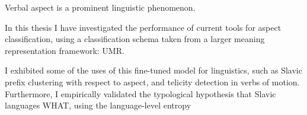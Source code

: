 Verbal aspect is a prominent linguistic phenomenon.

In this thesis I have investigated the performance of current tools for aspect classification, using a classification schema taken from a larger meaning representation framework: UMR.

I exhibited some of the uses of this fine-tuned model for linguistics, such as Slavic prefix clustering with respect to aspect, and telicity detection in verbs of motion. Furthermore, I empirically validated the typological hypothesis that Slavic languages WHAT, using the language-level entropy